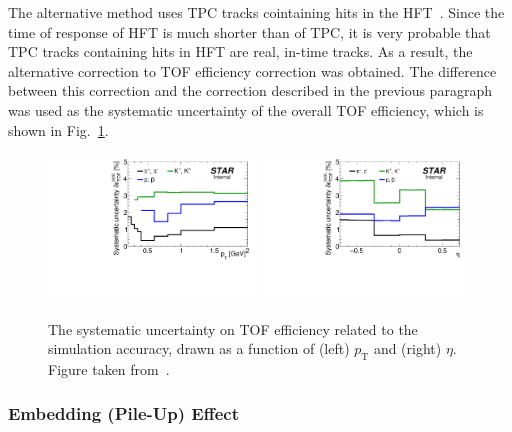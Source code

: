 The alternative method uses TPC tracks cointaining hits in the HFT~\cite{RafalThesis}. Since the time of response of HFT is much shorter than of TPC, it is very probable that TPC tracks containing hits in HFT are real, in-time tracks. As a result, the alternative correction to  TOF efficiency correction was obtained. The difference between this correction  and the correction described in the previous paragraph was used as  the systematic uncertainty of the overall TOF efficiency, which is shown in Fig.~\ref{fig:tofEffiSyst}.
\begin{figure}[h!]
	\centering
	\includegraphics[width=0.49\textwidth,page=1]{chapters/chrgSTAR/img/tofEff/TofSystError_pT.pdf}
	\includegraphics[width=0.49\textwidth,page=1]{chapters/chrgSTAR/img/tofEff/TofSystError_eta.pdf}
	\caption{The systematic uncertainty on TOF efficiency  related to the simulation accuracy, drawn as a function of (left) $p_\textrm{T}$ and (right) $\eta$. Figure taken from~\cite{RafalThesis}.}
	\label{fig:tofEffiSyst}
	
\end{figure}


\subsubsection{Embedding (Pile-Up) Effect}


